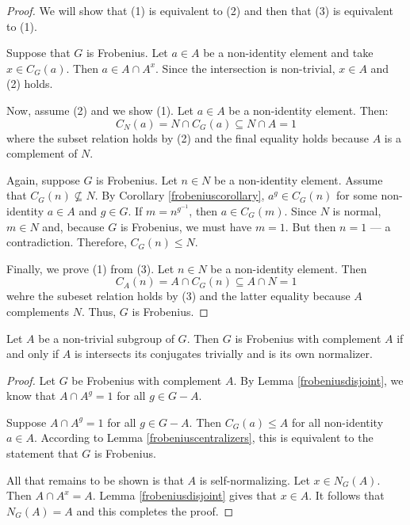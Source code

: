 \documentclass[main.tex]{subfiles}
\begin{document}
\begin{proof}
We will show that (1) is equivalent to (2) and then that (3) is equivalent to (1).

Suppose that $G$ is Frobenius. Let $a \in A$ be a non-identity element and take $x \in C_G(a)$. Then $a \in A \cap A^x$. Since the intersection is non-trivial, $x \in A$ and (2) holds.

Now, assume (2) and we show (1). Let $a \in A$ be a non-identity element. Then:
$$C_N(a) = N \cap C_G(a) \subseteq N \cap A = 1$$
where the subset relation holds by (2) and the final equality holds because $A$ is a complement of $N$.

Again, suppose $G$ is Frobenius. Let $n \in N$ be a non-identity element. Assume that $C_G(n) \not\subseteq N$. By Corollary \ref{frobeniuscorollary}, $a^g \in C_G(n)$ for some non-identity $a \in A$ and $g \in G$. If $m = n^{g^{-1}}$, then $a \in C_G(m)$. Since $N$ is normal, $m \in N$ and, because $G$ is Frobenius, we must have $m=1$. But then $n = 1$ --- a contradiction. Therefore, $C_G(n) \le N$.

Finally, we prove (1) from (3). Let $n \in N$ be a non-identity element. Then
$$C_A(n) = A \cap C_G(n) \subseteq A \cap N = 1$$
wehre the subeset relation holds by (3) and the latter equality because $A$ complements $N$. Thus, $G$ is Frobenius.
\end{proof}

\begin{lemma}\label{frobeniusnormalizer}
Let $A$ be a non-trivial subgroup of $G$. Then $G$ is Frobenius with complement $A$ if and only if $A$ is intersects its conjugates trivially and is its own normalizer.
\end{lemma}

\begin{proof}
Let $G$ be Frobenius with complement $A$. By Lemma \ref{frobeniusdisjoint}, we know that $A \cap A^g = 1$ for all $g \in G - A$.

Suppose $A \cap A^g = 1$ for all $g \in G - A$. Then $C_G(a) \le A$ for all non-identity $a \in A$.  According to Lemma \ref{frobeniuscentralizers}, this is equivalent to the statement that $G$ is Frobenius.

All that remains to be shown is that $A$ is self-normalizing. Let $x \in N_G(A)$. Then $A \cap A^x = A$. Lemma \ref{frobeniusdisjoint} gives that $x \in A$. It follows that $N_G(A) = A$ and this completes the proof.
\end{proof}
\end{document}
